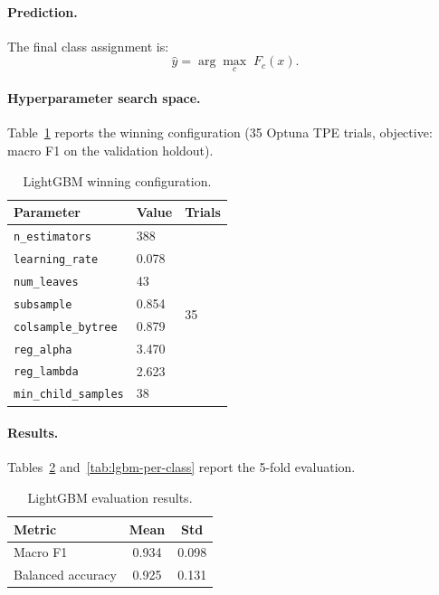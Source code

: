 \paragraph{Prediction.}
The final class assignment is:
\begin{equation}
    \hat{y} = \arg\max_{c}\; F_c(x).
\end{equation}

\paragraph{Hyperparameter search space.}
Table~\ref{tab:lgbm-hpo} reports the winning configuration (35 Optuna TPE trials, objective: macro F1 on the validation holdout).
\begin{table}[H]
\centering
\caption{LightGBM winning configuration.\label{tab:lgbm-hpo}}
\begin{tabular}{lll}
\toprule
\textbf{Parameter} & \textbf{Value} & \textbf{Trials} \\
\midrule
\texttt{n\_estimators}       & 388   & \multirow{8}{*}{35} \\
\texttt{learning\_rate}      & 0.078 & \\
\texttt{num\_leaves}         & 43    & \\
\texttt{subsample}           & 0.854 & \\
\texttt{colsample\_bytree}   & 0.879 & \\
\texttt{reg\_alpha}          & 3.470 & \\
\texttt{reg\_lambda}         & 2.623 & \\
\texttt{min\_child\_samples} & 38    & \\
\bottomrule
\end{tabular}
\end{table}

\paragraph{Results.}
Tables~\ref{tab:lgbm-results} and~\ref{tab:lgbm-per-class} report the 5-fold evaluation.
\begin{table}[H]
\centering
\caption{LightGBM evaluation results.\label{tab:lgbm-results}}
\begin{tabular}{lcc}
\toprule
\textbf{Metric} & \textbf{Mean} & \textbf{Std} \\
\midrule
Macro F1          & 0.934 & 0.098 \\
Balanced accuracy & 0.925 & 0.131 \\
\bottomrule
\end{tabular}
\end{table}

